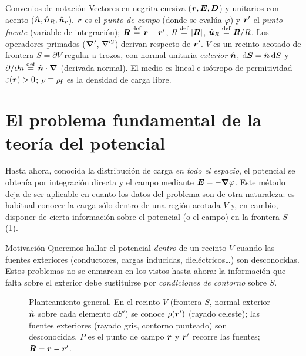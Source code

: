\documentclass[11pt,a4paper,twoside]{article}
\begin{document}
\thispagestyle{plain}
\tableofcontents
\vspace{1cm}
\begin{nota}{Convenios de notación}
Vectores en negrita cursiva ($\bm{r},\bm{E},\bm{D}$) y unitarios con acento ($\hat{\bm{n}},\hat{\bm{u}}_{R},\hat{\bm{u}}_r$).
$\bm{r}$ es el \emph{punto de campo} (donde se evalúa $\varphi$) y $\bm{r}'$ el \emph{punto fuente}
(variable de integración); $\bm{R}\mathrel{\overset{\mathrm{def}}{=}}\bm{r}-\bm{r}'$, $R\mathrel{\overset{\mathrm{def}}{=}}\left\lvert \bm{R}\right\rvert$, $\hat{\bm{u}}_{R}\mathrel{\overset{\mathrm{def}}{=}}\bm{R}/R$.
Los operadores primados ($\bm{\nabla}'$, $\nabla'^{2}$) derivan respecto de $\bm{r}'$. $V$ es un recinto
acotado de frontera $S=\partial V$ regular a trozos, con normal unitaria \emph{exterior} $\hat{\bm{n}}$,
$\mathrm{d}\bm S=\hat{\bm{n}}\,\mathrm{d} S$ y $\partial/\partial n\mathrel{\overset{\mathrm{def}}{=}}\hat{\bm{n}}\cdot\bm{\nabla}$ (derivada normal).
El medio es lineal e isótropo de permitividad $\varepsilon(\bm{r})>0$; $\rho\equiv\rho_{\mathrm{f}}$ es la densidad
de carga libre.
\end{nota}
\clearpage

\section{El problema fundamental de la teoría del potencial}

Hasta ahora, conocida la distribución de carga \emph{en todo el espacio}, el potencial se
obtenía por integración directa y el campo mediante $\bm{E}=-\bm{\nabla}\varphi$. Este método deja de
ser aplicable en cuanto los datos del problema son de otra naturaleza: es habitual conocer
la carga sólo dentro de una región acotada $V$ y, en cambio, disponer de cierta información
sobre el potencial (o el campo) en la frontera $S$ (\cref{fig:region}).

\begin{nota}{Motivación}
Queremos hallar el potencial \emph{dentro} de un recinto $V$ cuando las fuentes exteriores
(conductores, cargas inducidas, dieléctricos\dots) son desconocidas. Estos problemas no se
enmarcan en los vistos hasta ahora: la información que falta sobre el exterior debe
sustituirse por \emph{condiciones de contorno} sobre $S$.
\end{nota}

\begin{figure}[!htb]
  \centering
  
  \caption{Planteamiento general. En el recinto $V$ (frontera $S$, normal exterior $\hat{\bm{n}}$
  sobre cada elemento $\dd S'$) se conoce $\rho(\bm{r}')$ (rayado celeste); las fuentes
  exteriores (rayado gris, contorno punteado) son desconocidas. $P$ es el punto de campo
  $\bm{r}$ y $\bm{r}'$ recorre las fuentes; $\bm{R}=\bm{r}-\bm{r}'$.}
  \label{fig:region}
\end{figure}
\end{document}
